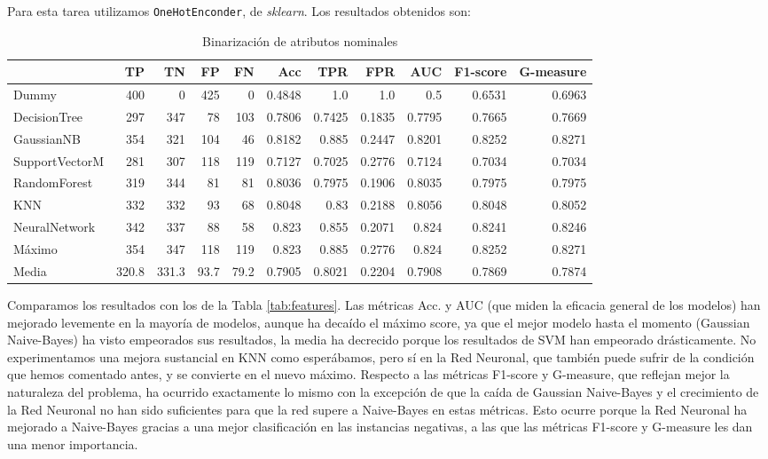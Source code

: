 \documentclass{article}
\begin{document}
Para esta tarea utilizamos \texttt{OneHotEnconder}, de
\textit{sklearn}. Los resultados obtenidos son:

\begin{table}[H]
\centering
\caption{Binarización de atributos nominales}
\label{tab:binarization}
\begin{tabular}{|lrrrrrrrrrr|}
\hline
 & TP & TN & FP & FN & Acc & TPR & FPR & AUC & F1-score & G-measure\\ \hline
Dummy & 400 & 0 & 425 & 0 & 0.4848 & 1.0 & 1.0 & 0.5 & 0.6531 & 0.6963\\
DecisionTree & 297 & 347 & 78 & 103 & 0.7806 & 0.7425 & 0.1835 & 0.7795 & 0.7665 & 0.7669\\
GaussianNB & 354 & 321 & 104 & 46 & 0.8182 & 0.885 & 0.2447 & 0.8201 & 0.8252 & 0.8271\\
SupportVectorM & 281 & 307 & 118 & 119 & 0.7127 & 0.7025 & 0.2776 & 0.7124 & 0.7034 & 0.7034\\
RandomForest & 319 & 344 & 81 & 81 & 0.8036 & 0.7975 & 0.1906 & 0.8035 & 0.7975 & 0.7975\\
KNN & 332 & 332 & 93 & 68 & 0.8048 & 0.83 & 0.2188 & 0.8056 & 0.8048 & 0.8052\\
NeuralNetwork & 342 & 337 & 88 & 58 & 0.823 & 0.855 & 0.2071 & 0.824 & 0.8241 & 0.8246\\ \hline
Máximo & 354 & 347 & 118 & 119 & 0.823 & 0.885 & 0.2776 & 0.824 & 0.8252 & 0.8271\\
Media & 320.8 & 331.3 & 93.7 & 79.2 & 0.7905 & 0.8021 & 0.2204 & 0.7908 & 0.7869 & 0.7874\\
\hline
\end{tabular}
\end{table}

Comparamos los resultados con los de la Tabla \ref{tab:features}. Las
métricas Acc. y AUC (que miden la eficacia general de los modelos) han
mejorado levemente en la mayoría de modelos, aunque ha decaído el
máximo score, ya que el mejor modelo hasta el momento (Gaussian
Naive-Bayes) ha visto empeorados sus resultados, la media ha decrecido
porque los resultados de SVM han empeorado drásticamente. No
experimentamos una mejora sustancial en KNN como esperábamos, pero sí
en la Red Neuronal, que también puede sufrir de la condición que hemos
comentado antes, y se convierte en el nuevo máximo. Respecto a las
métricas F1-score y G-measure, que reflejan mejor la naturaleza del
problema, ha ocurrido exactamente lo mismo con la excepción de que la
caída de Gaussian Naive-Bayes y el crecimiento de la Red Neuronal no
han sido suficientes para que la red supere a Naive-Bayes en estas
métricas. Esto ocurre porque la Red Neuronal ha mejorado a Naive-Bayes
gracias a una mejor clasificación en las instancias negativas, a las
que las métricas F1-score y G-measure les dan una menor importancia.
\end{document}
